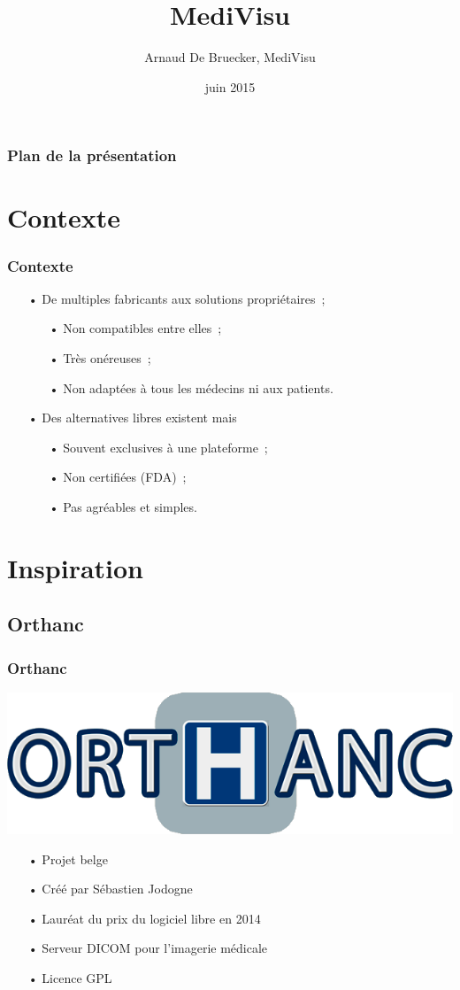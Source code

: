 \documentclass[11pt]{beamer}
\author{Arnaud De Bruecker, MediVisu}
\title{MediVisu}
\institute{HEB - ESI}
\date{juin 2015}
\begin{document}
\begin{frame}
\titlepage
\end{frame}

\begin{frame}
\frametitle{Plan de la présentation}
\tableofcontents
\end{frame}

\section{Contexte}

\begin{frame}
\frametitle{Contexte}
\begin{itemize}[<+->]
\item[•] De multiples fabricants aux solutions propriétaires~;
\begin{itemize}[<+->]
\item[•] Non compatibles entre elles~;
\item[•] Très onéreuses~;
\item[•] Non adaptées à tous les médecins ni aux patients.
\end{itemize}
\item[•] Des alternatives libres existent mais \cdots{}
\begin{itemize}[<+->]
\item[•] Souvent exclusives à une plateforme~;
\item[•] Non certifiées (FDA)~;
\item[•] Pas agréables et simples.
\end{itemize}
\end{itemize}
\end{frame}

\section{Inspiration}

\subsection{Orthanc}

\begin{frame}
\frametitle{Orthanc}
\includegraphics[scale=0.15]{Orthanc.png}
\begin{itemize}[<+->]
\item[•] Projet belge
\item[•] Créé par Sébastien Jodogne
\item[•] Lauréat du prix du logiciel libre en 2014
\item[•] Serveur DICOM pour l'imagerie médicale
\item[•] Licence GPL
\end{itemize}
\end{frame}
\end{document}
